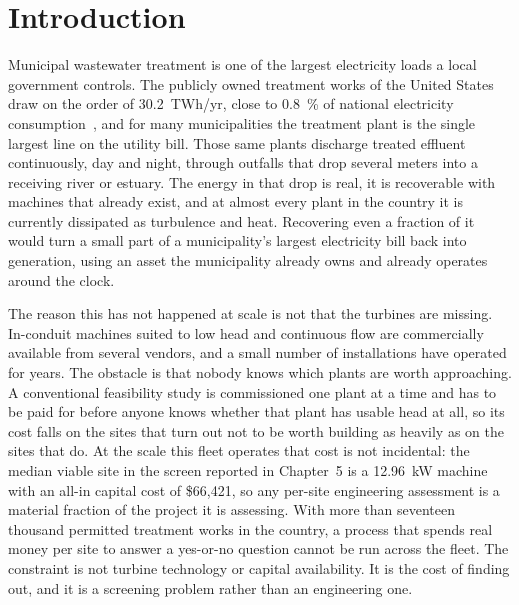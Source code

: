 \documentclass[12pt,letterpaper]{report}
\begin{document}
\chapter{Introduction}

Municipal wastewater treatment is one of the largest electricity loads a local
government controls. The publicly owned treatment works of the United States draw
on the order of 30.2~TWh/yr, close to 0.8~\% of national electricity
consumption~\cite{epri2013}, and for many municipalities the treatment plant is
the single largest line on the utility bill. Those same plants discharge treated
effluent continuously, day and night, through outfalls that drop several meters
into a receiving river or estuary. The energy in that drop is real, it is
recoverable with machines that already exist, and at almost every plant in the
country it is currently dissipated as turbulence and heat. Recovering even a
fraction of it would turn a small part of a municipality's largest electricity
bill back into generation, using an asset the municipality already owns and
already operates around the clock.

The reason this has not happened at scale is not that the turbines are missing.
In-conduit machines suited to low head and continuous flow are commercially
available from several vendors, and a small number of installations have operated
for years. The obstacle is that nobody knows which plants are worth approaching.
A conventional feasibility study is commissioned one plant at a time and has to be
paid for before anyone knows whether that plant has usable head at all, so its
cost falls on the sites that turn out not to be worth building as heavily as on
the sites that do. At the scale this fleet operates that cost is not incidental:
the median viable site in the screen reported in Chapter~5 is a 12.96~kW machine
with an all-in capital cost of \$66{,}421, so any per-site engineering assessment
is a material fraction of the project it is assessing. With more than seventeen
thousand permitted treatment works in the country, a process that spends real
money per site to answer a yes-or-no question cannot be run across the fleet. The
constraint is not turbine technology or capital availability. It is the cost of
finding out, and it is a screening problem rather than an engineering one.
\end{document}
